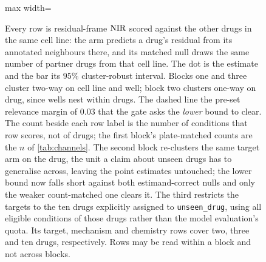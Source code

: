 \begin{figure}[htbp]
\begin{fullwidth}
\begin{adjustbox}{max width=\linewidth}
\end{adjustbox}
\caption[The channel gate, by conditioning]{
Every row is residual-frame $\textrm{NIR}$ scored against the other drugs in the same
cell line: the arm predicts a drug's residual from its annotated neighbours
there, and its matched null draws the same number of partner drugs from that
cell line.
The dot is the estimate and the bar its $95\%$ cluster-robust interval. Blocks
one and three cluster two-way on cell line and well; block two clusters one-way
on drug, since wells nest within drugs. The
dashed line the pre-set relevance margin of $0.03$ that the gate asks the
\emph{lower} bound to clear. The count beside each row label is the number of
conditions that row scores, not of drugs; the first block's plate-matched counts
are the $n$ of \cref{tab:channels}. The second block re-clusters the same target
arm on the drug, the unit a claim about unseen drugs has to generalise across,
leaving the point estimates untouched; the lower bound now falls short against both
estimand-correct nulls and only the weaker count-matched one clears it. The third
restricts the targets to the ten drugs explicitly assigned to
\texttt{unseen\_drug}, using all eligible conditions of those drugs rather than
the model evaluation's quota. Its target, mechanism and chemistry rows cover
two, three and ten drugs, respectively. Rows may be read within a block and not
across blocks.}
\label{fig:gate}
\end{fullwidth}
\end{figure}
